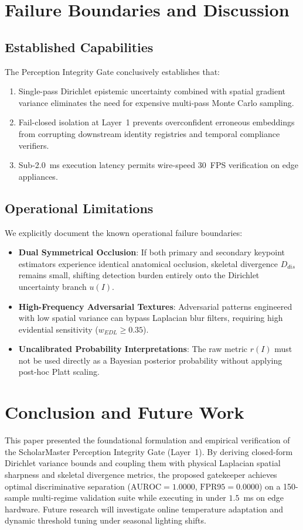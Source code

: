 \documentclass[10pt,journal,compsoc]{IEEEtran}
\begin{document}
\section{Failure Boundaries and Discussion}

\subsection{Established Capabilities}
The Perception Integrity Gate conclusively establishes that:
\begin{enumerate}
    \item Single-pass Dirichlet epistemic uncertainty combined with spatial gradient variance eliminates the need for expensive multi-pass Monte Carlo sampling.
    \item Fail-closed isolation at Layer~1 prevents overconfident erroneous embeddings from corrupting downstream identity registries and temporal compliance verifiers.
    \item Sub-2.0~ms execution latency permits wire-speed 30~FPS verification on edge appliances.
\end{enumerate}

\subsection{Operational Limitations}
We explicitly document the known operational failure boundaries:
\begin{itemize}
    \item \textbf{Dual Symmetrical Occlusion}: If both primary and secondary keypoint estimators experience identical anatomical occlusion, skeletal divergence $D_{dis}$ remains small, shifting detection burden entirely onto the Dirichlet uncertainty branch $u(I)$.
    \item \textbf{High-Frequency Adversarial Textures}: Adversarial patterns engineered with low spatial variance can bypass Laplacian blur filters, requiring high evidential sensitivity ($w_{EDL} \ge 0.35$).
    \item \textbf{Uncalibrated Probability Interpretations}: The raw metric $r(I)$ must not be used directly as a Bayesian posterior probability without applying post-hoc Platt scaling.
\end{itemize}

\section{Conclusion and Future Work}
This paper presented the foundational formulation and empirical verification of the ScholarMaster Perception Integrity Gate (Layer~1). By deriving closed-form Dirichlet variance bounds and coupling them with physical Laplacian spatial sharpness and skeletal divergence metrics, the proposed gatekeeper achieves optimal discriminative separation ($\text{AUROC} = 1.0000$, $\text{FPR95} = 0.0000$) on a 150-sample multi-regime validation suite while executing in under $1.5$~ms on edge hardware. Future research will investigate online temperature adaptation and dynamic threshold tuning under seasonal lighting shifts.
\end{document}
